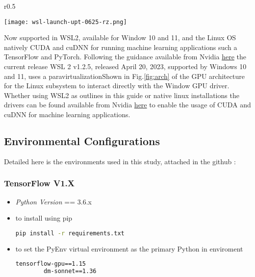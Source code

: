 \begin{wrapfigure}{r}{0.5\textwidth}
	\vspace{-1.5cm}
	\begin{center}
		\texttt{[image: wsl-launch-upt-0625-rz.png]}
	\end{center}
	\label{fig:arch}
\end{wrapfigure}

Now supported in WSL2, available for Window 10 and 11, and the Linux OS natively CUDA and cuDNN for running machine learning applications such a TensorFlow and PyTorch. Following the guidance available from Nvidia \href{https://docs.nvidia.com/cuda/wsl-user-guide/index.html}{here} the current release WSL 2 v1.2.5, released April 20, 2023, supported by Windows 10 and 11, uses a paravirtualizationShown in Fig.\ref{fig:arch} of the GPU architecture for the Linux subsystem to interact directly with the Window GPU driver. Whether using WSL2 as outlines in this guide or native linux installations the drivers can be found available from Nvidia \href{https://www.nvidia.com/Download/index.aspx?lang=en-us}{here} to enable the usage of CUDA and cuDNN for machine learning applications.

\pagebreak
\subsection{Environmental Configurations}
Detailed here is the environments used in this study, attached in the github :
\subsubsection{TensorFlow V1.X}
\begin{itemize}
	\item \textit{Python Version} == 3.6.x
	\item to install using pip
	\begin{lstlisting}[language=bash]
		pip install -r requirements.txt \end{lstlisting}
	\item to set the PyEnv virtual environment as the primary Python in enviroment 
	\begin{lstlisting}[language=bash]
		tensorflow-gpu==1.15
		dm-sonnet==1.36\end{lstlisting}
\end{itemize}
